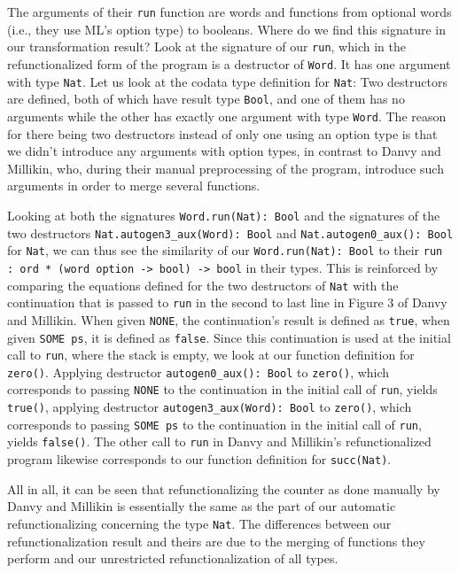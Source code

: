 The arguments of their \texttt{run} function are words and functions from optional words  (i.e., they use ML's option type) to booleans. Where do we find this signature in our transformation result? Look at the signature of our \texttt{run}, which in the refunctionalized form of the program is a destructor of \texttt{Word}. It has one argument with type \texttt{Nat}. Let us look at the codata type definition for \texttt{Nat}: Two destructors are defined, both of which have result type \texttt{Bool}, and one of them has no arguments while the other has exactly one argument with type \texttt{Word}. The reason for there being two destructors instead of only one using an option type is that we didn't introduce any arguments with option types, in contrast to Danvy and Millikin, who, during their manual preprocessing of the program, introduce such arguments in order to merge several functions.

Looking at both the signatures \texttt{Word.run(Nat): Bool} and the signatures of the two destructors \texttt{Nat.autogen3\_aux(Word): Bool} and \texttt{Nat.autogen0\_aux(): Bool} for \texttt{Nat}, we can thus see the similarity of our \texttt{Word.run(Nat): Bool} to their \texttt{run : ord * (word option -> bool) -> bool} in their types. This is reinforced by comparing the equations defined for the two destructors of \texttt{Nat} with the continuation that is passed to \texttt{run} in the second to last line in Figure 3 of Danvy and Millikin. When given \texttt{NONE}, the continuation's result is defined as \texttt{true}, when given \texttt{SOME ps}, it is defined as \texttt{false}. Since this continuation is used at the initial call to \texttt{run}, where the stack is empty, we look at our function definition for \texttt{zero()}. Applying destructor \texttt{autogen0\_aux(): Bool} to \texttt{zero()}, which corresponds to passing \texttt{NONE} to the continuation in the initial call of \texttt{run}, yields \texttt{true()}, applying destructor \texttt{autogen3\_aux(Word): Bool} to \texttt{zero()}, which corresponds to passing \texttt{SOME ps} to the continuation in the initial call of \texttt{run}, yields \texttt{false()}. The other call to \texttt{run} in Danvy and Millikin's refunctionalized program likewise corresponds to our function definition for \texttt{succ(Nat)}.

All in all, it can be seen that refunctionalizing the counter as done manually by Danvy and Millikin is essentially the same as the part of our automatic refunctionalizing concerning the type \texttt{Nat}. The differences between our refunctionalization result and theirs are due to the merging of functions they perform and our unrestricted refunctionalization of all types.
